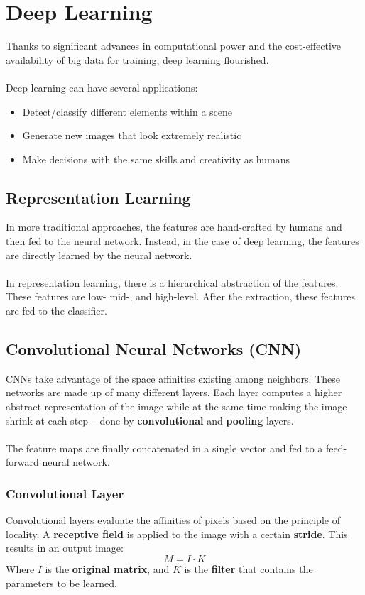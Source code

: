 \documentclass{article}
\begin{document}
\section{Deep Learning}
Thanks to significant advances in computational power and the cost-effective availability of big data for training, deep learning flourished. \\ \\
Deep learning can have several applications:

\begin{itemize}
	\item Detect/classify different elements within a scene
	\item Generate new images that look extremely realistic
	\item Make decisions with the same skills and creativity as humans
\end{itemize}
\subsection{Representation Learning}
In more traditional approaches, the features are hand-crafted by humans and then fed to the neural network. Instead, in the case of deep learning, the features are directly learned by the neural network. \\ \\
In representation learning, there is a hierarchical abstraction of the features. These features are low- mid-, and high-level. After the extraction, these features are fed to the classifier.

\subsection{Convolutional Neural Networks (CNN)}
CNNs take advantage of the space affinities existing among neighbors. These networks are made up of many different layers. Each layer computes a higher abstract representation of the image while at the same time making the image shrink at each step -- done by \textbf{convolutional} and \textbf{pooling} layers. \\ \\
The feature maps are finally concatenated in a single vector and fed to a feed-forward neural network.

\subsubsection{Convolutional Layer}
Convolutional layers evaluate the affinities of pixels based on the principle of locality. A \textbf{receptive field} is applied to the image with a certain \textbf{stride}. This results in an output image:
\[ M = I \cdot K \]
Where $I$ is the \textbf{original matrix}, and $K$ is the \textbf{filter} that contains the parameters to be learned.
\end{document}
